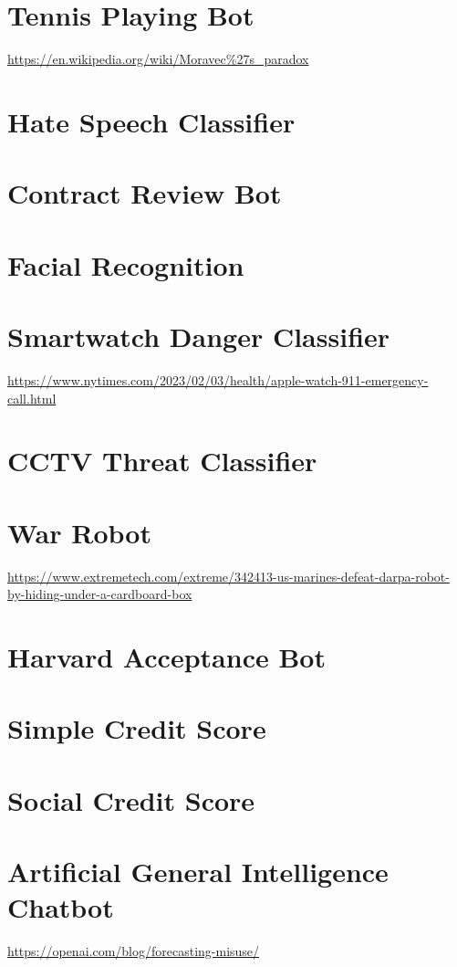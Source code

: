 \section{Tennis Playing Bot}

\url{https://en.wikipedia.org/wiki/Moravec\%27s_paradox}

\section{Hate Speech Classifier}
\section{Contract Review Bot}
\section{Facial Recognition}
\section{Smartwatch Danger Classifier} 

\url{https://www.nytimes.com/2023/02/03/health/apple-watch-911-emergency-call.html}

\section{CCTV Threat Classifier}
\section{War Robot}

\url{https://www.extremetech.com/extreme/342413-us-marines-defeat-darpa-robot-by-hiding-under-a-cardboard-box}

\section{Harvard Acceptance Bot}
\section{Simple Credit Score}
\section{Social Credit Score}
\section{Artificial General Intelligence Chatbot}

\url{https://openai.com/blog/forecasting-misuse/}
